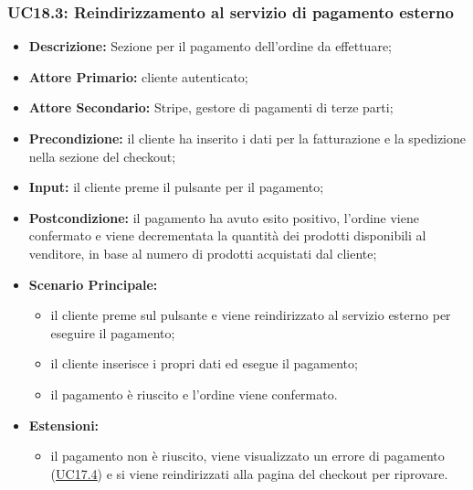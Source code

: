             \subsubsection{UC18.3: Reindirizzamento al servizio di pagamento esterno}
            \label{sec:UC18.3}
                \begin{itemize}
                    \item \textbf{Descrizione:} Sezione per il pagamento dell'ordine da effettuare;
                    \item \textbf{Attore Primario:} cliente autenticato;
                    \item \textbf{Attore Secondario:} Stripe, gestore di pagamenti di terze parti;
                    \item \textbf{Precondizione:} il cliente ha inserito i dati per la fatturazione e la spedizione nella sezione del checkout;
                    \item \textbf{Input:} il cliente preme il pulsante per il pagamento;
                    \item \textbf{Postcondizione:} il pagamento ha avuto esito positivo, l'ordine viene confermato e viene decrementata la quantità dei prodotti disponibili al venditore, in base al numero di prodotti acquistati dal cliente;
                    \item \textbf{Scenario Principale:}
                    \begin{itemize}
                        \item il cliente preme sul pulsante e viene reindirizzato al servizio esterno per eseguire il pagamento;
                        \item il cliente inserisce i propri dati ed esegue il pagamento;
                        \item il pagamento è riuscito e l'ordine viene confermato.
                    \end{itemize}
                    \item \textbf{Estensioni:}
                    \begin{itemize}
                        \item il pagamento non è riuscito, viene visualizzato un errore di pagamento (\hyperref[sec:UC17.4]{\underline{UC17.4}}) e si viene reindirizzati alla pagina del checkout per riprovare.
                    \end{itemize}
                \end{itemize}
